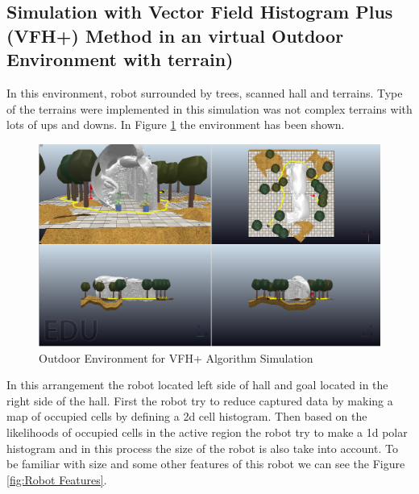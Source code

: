 \subsection{Simulation with Vector Field Histogram Plus (VFH+) Method in an virtual Outdoor Environment with terrain) }

In this environment, robot surrounded by trees, scanned hall and terrains. Type of the terrains were implemented in this simulation was not complex terrains with lots of ups and downs. In Figure \ref{fig:Outdoor Environment for VFH+ Algorithm Simulation} the environment has been shown. 
\begin{figure}[H]
  \centering
  \includegraphics[width= 1.0\textwidth]{Figures/VFH+TERRAIN.PNG}
  \caption[Outdoor Environment for VFH+ Algorithm Simulation]{Outdoor Environment for VFH+ Algorithm Simulation}
   \label{fig:Outdoor Environment for VFH+ Algorithm Simulation}
\end{figure}
\noindent In this arrangement the robot located left side of hall and goal located in the right side of the hall. First the robot try to reduce captured data by making a map of occupied cells by defining a 2d cell histogram. Then based on the likelihoods of occupied cells in the active region the robot try to make a 1d polar histogram and in this process the size of the robot is also take into account. 
To be familiar with size and some other features of this robot we can see the Figure \ref{fig:Robot Features}. 
